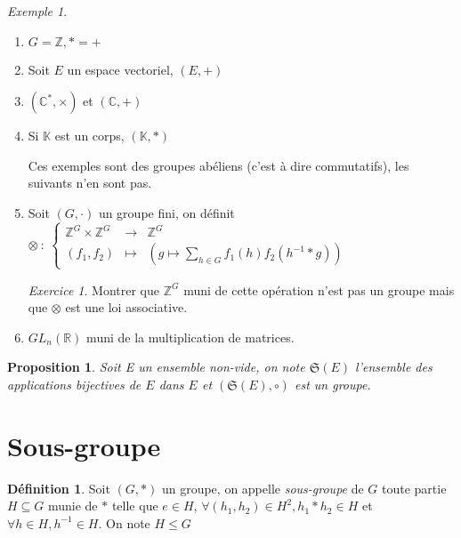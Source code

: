 \documentclass[]{article}
\newtheorem{myproposition}{Proposition}
\theoremstyle{remark}
\newtheorem{myexer}{Exercice}
\newtheorem{myexmpl}{Exemple}
\theoremstyle{definition}
\newtheorem{mydef}{Définition}
\newcommand{\func}[5]{
#1 ~ : ~ \left\{ \begin{array}{lcl}
	#2 & \longrightarrow & #3 \\
	#4 & \longmapsto & #5
\end{array}
\right.
}
\begin{document}
\begin{myexmpl}
	\leavevmode
	\begin{enumerate}
		\item $G=\mathbb{Z}, *=+$
		\item Soit $E$ un espace vectoriel, $(E, +)$
		\item $(\mathbb{C}^*, \times)$ et $(\mathbb{C}, +)$
		\item Si $\mathbb{K}$ est un corps, $(\mathbb{K}, *)$

		Ces exemples sont des groupes abéliens (c'est à dire commutatifs), les suivants n'en sont pas.
		
		\item Soit $(G, \cdot)$ un groupe fini, on définit $\func{\otimes}{\mathbb{Z}^G \times \mathbb{Z}^G}{\mathbb{Z}^G}{(f_1,f_2)}{\left(g \longmapsto \displaystyle \sum_{h \in G} f_1(h)f_2(h^{-1}*g)\right)}$
		
		\begin{myexer}
			Montrer que $\mathbb{Z}^G$ muni de cette opération n'est pas un groupe mais que $\otimes$ est une loi associative.
		\end{myexer}
		\item $GL_n(\mathbb{R})$ muni de la multiplication de matrices.
	\end{enumerate}
\end{myexmpl}

\begin{myproposition}
	Soit E un ensemble non-vide, on note $\mathfrak{S}(E)$ l'ensemble des applications bijectives de $E$ dans $E$ et $(\mathfrak{S}(E), \circ)$ est un groupe.
\end{myproposition}

\section{Sous-groupe}

\begin{mydef}
	Soit $(G, *)$ un groupe, on appelle \textit{sous-groupe} de $G$ toute partie $H \subseteq G$ munie de $*$ telle que $e \in H$, $\forall (h_1,h_2) \in H^2, h_1*h_2 \in H$  et $\forall h \in H, h^{-1} \in H$.
	On note $H \leqslant G$
\end{mydef}
\end{document}
